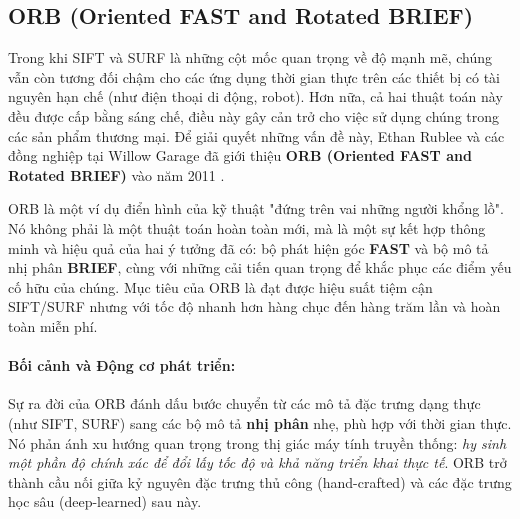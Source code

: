 \subsection{ORB (Oriented FAST and Rotated BRIEF)}
\label{subsec:orb}

Trong khi SIFT và SURF là những cột mốc quan trọng về độ mạnh mẽ, chúng vẫn còn tương đối chậm cho các ứng dụng thời gian thực trên các thiết bị có tài nguyên hạn chế (như điện thoại di động, robot). Hơn nữa, cả hai thuật toán này đều được cấp bằng sáng chế, điều này gây cản trở cho việc sử dụng chúng trong các sản phẩm thương mại. Để giải quyết những vấn đề này, Ethan Rublee và các đồng nghiệp tại Willow Garage đã giới thiệu \textbf{ORB (Oriented FAST and Rotated BRIEF)} vào năm 2011 \cite{Rublee2011}.

ORB là một ví dụ điển hình của kỹ thuật "đứng trên vai những người khổng lồ". Nó không phải là một thuật toán hoàn toàn mới, mà là một sự kết hợp thông minh và hiệu quả của hai ý tưởng đã có: bộ phát hiện góc \textbf{FAST} và bộ mô tả nhị phân \textbf{BRIEF}, cùng với những cải tiến quan trọng để khắc phục các điểm yếu cố hữu của chúng. Mục tiêu của ORB là đạt được hiệu suất tiệm cận SIFT/SURF nhưng với tốc độ nhanh hơn hàng chục đến hàng trăm lần và hoàn toàn miễn phí.

\paragraph{Bối cảnh và Động cơ phát triển:}
Sự ra đời của ORB đánh dấu bước chuyển từ các mô tả đặc trưng dạng thực (như SIFT, SURF) sang các bộ mô tả \textbf{nhị phân} nhẹ, phù hợp với thời gian thực. 
Nó phản ánh xu hướng quan trọng trong thị giác máy tính truyền thống: \textit{hy sinh một phần độ chính xác để đổi lấy tốc độ và khả năng triển khai thực tế}.
ORB trở thành cầu nối giữa kỷ nguyên đặc trưng thủ công (hand-crafted) và các đặc trưng học sâu (deep-learned) sau này.

